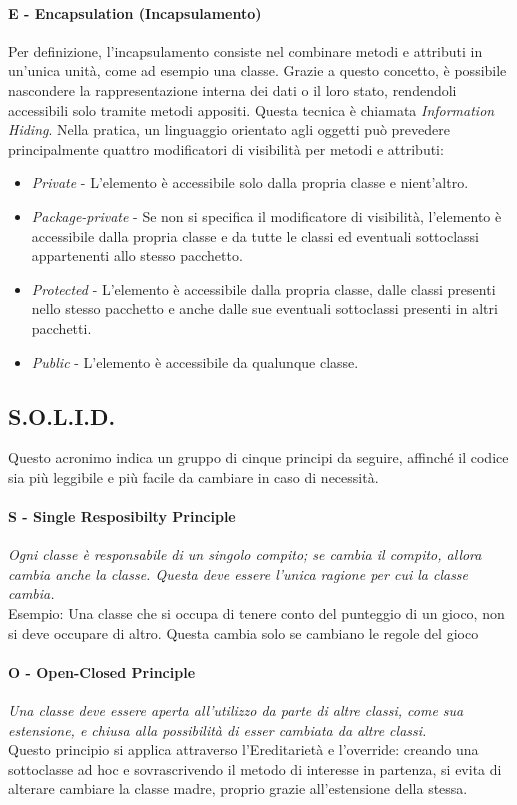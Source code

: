 \documentclass{article}
\begin{document}
        \paragraph{E - Encapsulation (Incapsulamento)} Per definizione, l'incapsulamento consiste nel combinare metodi e attributi in un'unica unità, come ad esempio una classe. Grazie a questo concetto, è possibile nascondere la rappresentazione interna dei dati o il loro stato, rendendoli accessibili solo tramite metodi appositi. Questa tecnica è chiamata \textit{Information Hiding}. Nella pratica, un linguaggio orientato agli oggetti può prevedere principalmente quattro modificatori di visibilità per metodi e attributi:
            \begin{itemize}
                \item \textit{Private} - L'elemento è accessibile solo dalla propria classe e nient'altro.
                \item \textit{Package-private} - Se non si specifica il modificatore di visibilità, l'elemento è accessibile dalla propria classe e da tutte le classi ed eventuali sottoclassi appartenenti allo stesso pacchetto.
                \item \textit{Protected} - L'elemento è accessibile dalla propria classe, dalle classi presenti nello stesso pacchetto e anche dalle sue eventuali sottoclassi presenti in altri pacchetti.
                \item \textit{Public} - L'elemento è accessibile da qualunque classe.
            \end{itemize}
        
    \subsection{S.O.L.I.D.}
        Questo acronimo indica un gruppo di cinque principi da seguire, affinché il codice sia più leggibile e più facile da cambiare in caso di necessità.
        \paragraph{S - Single Resposibilty Principle} \textit{Ogni classe è responsabile di un singolo compito; se cambia il compito, allora cambia anche la classe. Questa deve essere l'unica ragione per cui la classe cambia.}\\
        Esempio: Una classe che si occupa di tenere conto del punteggio di un gioco, non si deve occupare di altro. Questa cambia solo se cambiano le regole del gioco
        \paragraph{O - Open-Closed Principle} \textit{Una classe deve essere aperta all'utilizzo da parte di altre classi, come sua estensione, e chiusa alla possibilità di esser cambiata da altre classi.}\\
        Questo principio si applica attraverso l'Ereditarietà e l'override: creando una sottoclasse ad hoc e sovrascrivendo il metodo di interesse in partenza, si evita di alterare cambiare la classe madre, proprio grazie all'estensione della stessa.
\end{document}
